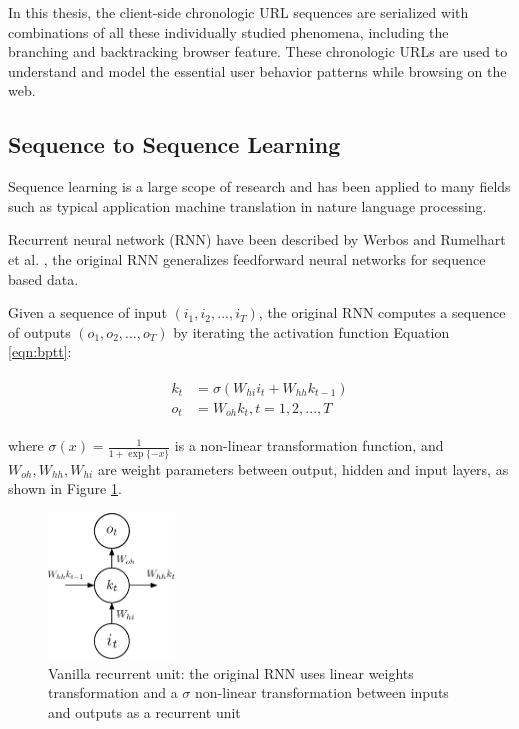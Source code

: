 In this thesis, the client-side chronologic URL sequences are serialized with combinations of all 
these individually studied phenomena, including the branching and backtracking browser 
feature. These chronologic URLs are used to understand and model the essential user 
behavior patterns while browsing on the web.


\subsection{Sequence to Sequence Learning}
\label{sec:seq-learn}

Sequence learning is a large scope of research and has been applied to many fields such as 
typical application machine translation in nature language processing. 

Recurrent neural network (RNN) have been described by Werbos \cite{werbos1990rnn} and 
Rumelhart et al. \cite{Rumelhart:1988:LRB:65669.104451}, the original RNN 
generalizes feedforward neural networks for sequence based data.

Given a sequence of input $(i_1, i_2, ..., i_T)$, the original RNN computes a
sequence of outputs $(o_1, o_2, ..., o_T)$ 
by iterating the activation function Equation \ref{eqn:bptt}:

\begin{align}
\label{eqn:bptt}
\begin{split}
    k_t &= \sigma \left( W_{hi}i_{t} + W_{hh}k_{t-1}\right) \\
    o_t &= W_{oh} k_t, t=1,2,...,T
\end{split}
\end{align}

where $\sigma(x) = \frac{1}{1+\exp\{-x\}}$ is a non-linear transformation function,
and $W_{oh}, W_{hh}, W_{hi}$ are weight parameters between output, hidden and input layers,
as shown in Figure \ref{fig:rnn}. 

\begin{figure}[H]
    \centering
    \includegraphics[width=0.30\textwidth]{figures/rnn}
    \caption{Vanilla recurrent unit: the original RNN uses linear weights 
    transformation and a $\sigma$ non-linear transformation between inputs and outputs 
    as a recurrent unit}
    \label{fig:rnn}
\end{figure}

